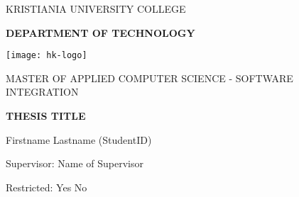 \begin{titlepage}
    \begin{center}
        \large
        \MakeUppercase{KRISTIANIA UNIVERSITY COLLEGE}
        
        \LARGE
        \textbf{\MakeUppercase{DEPARTMENT OF TECHNOLOGY}}
        
        \vspace{1cm}
        \texttt{[image: hk-logo]}
        
        \vspace{1cm}
        \Large
        \MakeUppercase{MASTER OF APPLIED COMPUTER SCIENCE - SOFTWARE INTEGRATION}
        
        \vspace{0.5cm}
        \LARGE
        \textbf{THESIS TITLE}
        
        \vspace{0.5cm}
        \Large
        Firstname Lastname (StudentID)
        
        \vspace{3.5cm}
        \large
        Supervisor: Name of Supervisor

        \vspace{1.5cm}        
        Restricted:
        \uncheckedbox Yes
        \checkedbox No
    \end{center}
\end{titlepage}
